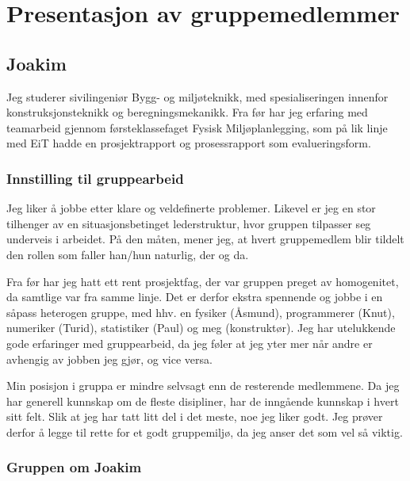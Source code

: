 \documentclass[a4paper,norsk]{article}
\author{Joakim Johnsen - joakij@stud.ntnu.no}
\begin{document}
\section{Presentasjon av gruppemedlemmer}

\subsection{Joakim}

Jeg studerer sivilingeniør Bygg- og miljøteknikk, med
spesialiseringen innenfor konstruksjonsteknikk og beregningsmekanikk. Fra før
har jeg erfaring med teamarbeid gjennom førsteklassefaget Fysisk
Miljøplanlegging, som på lik linje med EiT hadde en prosjektrapport og
prosessrapport som evalueringsform.

\subsubsection*{Innstilling til gruppearbeid}

Jeg liker å jobbe etter klare og veldefinerte problemer. Likevel
er jeg en stor tilhenger av en situasjonsbetinget lederstruktur, hvor gruppen
tilpasser seg underveis i arbeidet. På den måten, mener jeg, at hvert
gruppemedlem blir tildelt den rollen som faller han/hun naturlig, der og da. 

Fra før har jeg hatt ett rent prosjektfag, der var gruppen preget av
homogenitet, da samtlige var fra samme linje. Det er derfor ekstra spennende og
jobbe i en såpass heterogen gruppe, med hhv. en fysiker (Åsmund), programmerer
(Knut), numeriker (Turid), statistiker (Paul) og meg (konstruktør). Jeg har
utelukkende gode erfaringer med gruppearbeid, da jeg føler at jeg yter mer når
andre er avhengig av jobben jeg gjør, og vice versa.

Min posisjon i gruppa er mindre selvsagt enn de resterende medlemmene. Da jeg har generell
kunnskap om de fleste disipliner, har de inngående kunnskap i hvert sitt felt.
Slik at jeg har tatt litt del i det meste, noe jeg liker godt. Jeg prøver derfor
å legge til rette for et godt gruppemiljø, da jeg anser det som vel så viktig.

\subsubsection*{Gruppen om Joakim}



\end{document}
